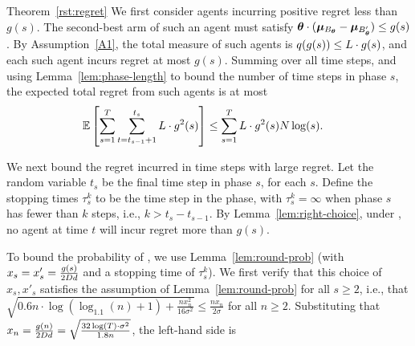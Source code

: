 \begin{emptyextraproof}{Theorem~\ref{rst:regret}}
We first consider agents \AgV incurring positive regret less than $g(s)$.
The second-best arm \Second{\AgV} of such an agent \AgV must satisfy
$\bm{\theta} \cdot (\bm{\mu}_{B_{\bm{\theta}}} - \bm{\mu}_{B'_{\bm{\theta}}}) \leq g(s)$.
By Assumption~\ref{A1}, 
the total measure of such agents
is $q(g(s)) \leq L \cdot g(s)$,
and each such agent incurs regret at most $g(s)$.
Summing over all time steps,
and using Lemma~\ref{lem:phase-length} to bound the number of time
steps in phase $s$, 
the expected total regret from such agents is at most
\begin{align}
\Expect{\sum_{s=1}^{T} \sum_{t=t_{s-1}+1}^{t_{s}} \TieDensity \cdot g^2(s)}
& \leq \sum_{s=1}^{T} \TieDensity \cdot g^2(s) \ARMNUM \log(s).
\label{equ:small_regret_bound}
\end{align}

We next bound the regret incurred in time steps with large regret.
Let the random variable $t_s$ be the final time step in phase $s$,
for each $s$.
Define the stopping times $\tau_{s}^{k}$ to be the 
time step in the  phase,
with $\tau_{s}^{k} = \infty$ when phase $s$ has fewer than $k$ steps,
i.e., $k > t_{s}-t_{s-1}$.
By Lemma~\ref{lem:right-choice},
under , no agent at time $t$ will incur
regret more than $g(s)$.
  
To bound the probability of ,
we use Lemma~\ref{lem:round-prob}
(with $x_s = x'_s = \frac{g(s)}{2 D d}$
and a stopping time of $\tau_s^k$).
We first verify that this choice of $x_s, x'_s$
satisfies the assumption of Lemma~\ref{lem:round-prob} for all
$s \geq 2$,
i.e., that
$\sqrt{0.6 n \cdot \log (\log_{1.1}(n) + 1) + \frac{n x_n^2}{16 \sigma^2}}
\leq \frac{n x_n}{2 \sigma}$
for all $n \geq 2$.
Substituting that
$x_n = \frac{g(n)}{2 D d} = \sqrt{\frac{32\log(T) \cdot \sigma^2}{1.8 n}}$,
the left-hand side is


\end{emptyextraproof}
